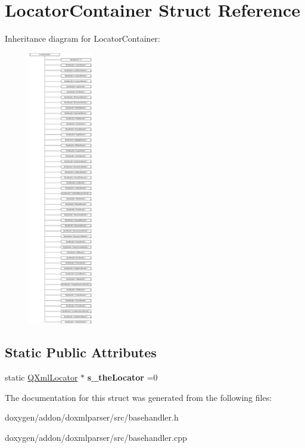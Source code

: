 \hypertarget{struct_locator_container}{}\section{Locator\+Container Struct Reference}
\label{struct_locator_container}
Inheritance diagram for Locator\+Container\+:\begin{figure}[H]
\begin{center}
\leavevmode
\includegraphics[height=12.000000cm]{struct_locator_container}
\end{center}
\end{figure}
\subsection*{Static Public Attributes}
\begin{DoxyCompactItemize}
\item 
\mbox{\label{struct_locator_container_aad414c38f6b321ec0b5907872987a92e}} 
static \mbox{\hyperlink{class_q_xml_locator}{Q\+Xml\+Locator}} $\ast$ {\bfseries s\+\_\+the\+Locator} =0
\end{DoxyCompactItemize}


The documentation for this struct was generated from the following files\+:\begin{DoxyCompactItemize}
\item 
doxygen/addon/doxmlparser/src/basehandler.\+h\item 
doxygen/addon/doxmlparser/src/basehandler.\+cpp\end{DoxyCompactItemize}
